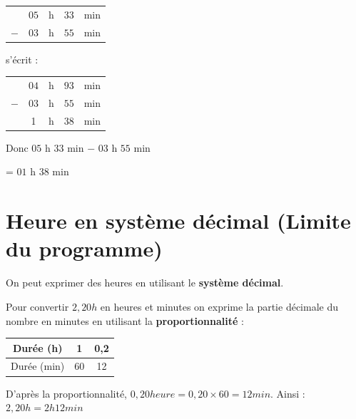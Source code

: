 \begin{pageCours}
\begin{Mt}
\begin{minipage}{0.23\linewidth}
\begin{tabular}{ccccc} 
& $05$ & h & {\color{sacado_red}$33$} & min \\ 
$-$   & $03$ & h & {\color{sacado_blue}$55$} & min\\ 
\hline 
\end{tabular} 
\end{minipage}
\hfill
\begin{minipage}{0.07\linewidth}
\begin{center}
s'écrit :  
\end{center}
\end{minipage}
\hfill
\begin{minipage}{0.23\linewidth}
\begin{tabular}{ccccc} 
& {\color{sacado_green}$04$} & h & {\color{sacado_green}$93$} & min \\ 
$-$   & $03$ & h &  {\color{sacado_blue}$55$} & min\\ 
\hline 
& 1 & h & 38 & min \\
\end{tabular}
\end{minipage}
\hfill
\begin{minipage}{0.35\linewidth}
Donc $05$ h $33$ min $-$ $03$ h $55$ min 

= $01$ h $38$ min
\end{minipage}

\end{Mt}



\section{Heure en système décimal (Limite du programme)}

\begin{Def}
On peut exprimer des heures en utilisant le \textbf{système décimal}.
\end{Def}

\begin{Mt}
Pour convertir $2,20h$ en heures et minutes on exprime la partie décimale du nombre en minutes en utilisant la \textbf{proportionnalité} :
\begin{tabular}{|c|c|c|}\hline
Durée (h) & 1 & 0,2\\ \hline
Durée (min) & 60 & 12\\ \hline
\end{tabular}

D'après la proportionnalité, $0,20 heure = 0,20\times60=12min$. Ainsi : $2,20h=2h12min$
\end{Mt}


\end{pageCours}




